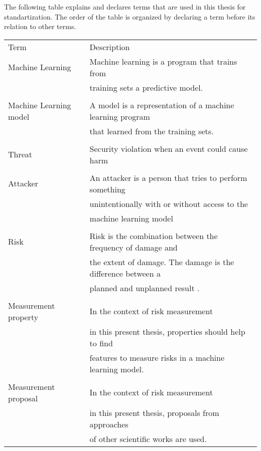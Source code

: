The following table explains and declares terms that are used in this thesis for standartization. The order of the table is organized by declaring a term before its relation to other terms.

\begin{center}
  \begin{tabular}{ |l|l|  }
    \hline
    \rowcolor{lightgray} Term & Description \\ [0.5ex]
    Machine Learning & Machine learning is a program that trains from \\
    & training sets a predictive model. \cite{google} \\
    & \\
    \hline
    Machine Learning model & A model is a representation of a machine learning program \\
    & that learned from the training sets. \cite{google} \\
    & \\
    \hline
    Threat & Security violation when an event could cause harm \cite{DBLP:journals/rfc/rfc4949} \\
    & \\
    \hline
    Attacker & An attacker is a person that tries to perform something \\
    & unintentionally with or without access to the \\
    & machine learning model \cite{bsi_glossar_2021} \\
    & \\
    \hline
    Risk & Risk is the combination between the frequency of damage and \\
    & the extent of damage. The damage is the difference between a \\
    & planned and unplanned result \cite{bsi_glossar_2021}. \\
    & \\
    \hline
    Measurement property & In the context of risk measurement \\
    & in this present thesis, properties should help to find \\
    & features to measure risks in a machine learning model. \\
    & \\
    \hline
    Measurement proposal & In the context of risk measurement \\
    & in this present thesis, proposals from approaches \\
    & of other scientific works are used. \\

\end{tabular}
\end{center}
